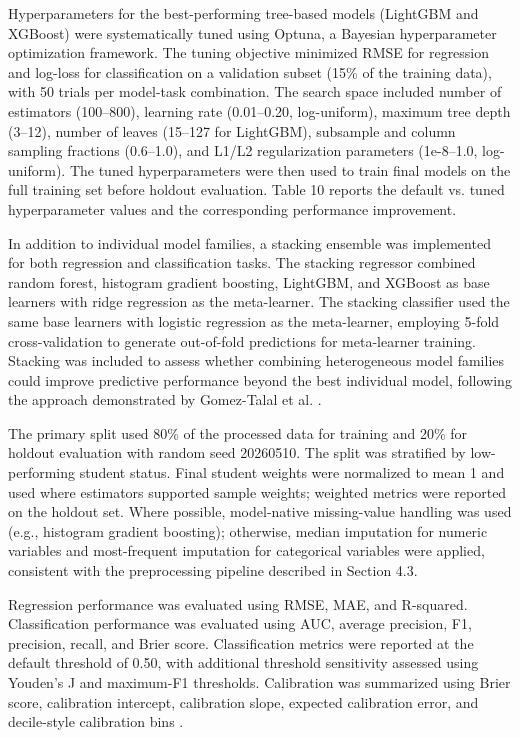 \documentclass[pdflatex,sn-mathphys-ay]{sn-jnl}
\begin{document}
Hyperparameters for the best-performing tree-based models (LightGBM and XGBoost) were systematically tuned using Optuna, a Bayesian hyperparameter optimization framework. The tuning objective minimized RMSE for regression and log-loss for classification on a validation subset (15\% of the training data), with 50 trials per model-task combination. The search space included number of estimators (100–800), learning rate (0.01–0.20, log-uniform), maximum tree depth (3–12), number of leaves (15–127 for LightGBM), subsample and column sampling fractions (0.6–1.0), and L1/L2 regularization parameters (1e-8–1.0, log-uniform). The tuned hyperparameters were then used to train final models on the full training set before holdout evaluation. Table 10 reports the default vs. tuned hyperparameter values and the corresponding performance improvement.

In addition to individual model families, a stacking ensemble was implemented for both regression and classification tasks. The stacking regressor combined random forest, histogram gradient boosting, LightGBM, and XGBoost as base learners with ridge regression as the meta-learner. The stacking classifier used the same base learners with logistic regression as the meta-learner, employing 5-fold cross-validation to generate out-of-fold predictions for meta-learner training. Stacking was included to assess whether combining heterogeneous model families could improve predictive performance beyond the best individual model, following the approach demonstrated by Gomez-Talal et al. \citep{Gomez_Talal_2025}.

The primary split used 80\% of the processed data for training and 20\% for holdout evaluation with random seed 20260510. The split was stratified by low-performing student status. Final student weights were normalized to mean 1 and used where estimators supported sample weights; weighted metrics were reported on the holdout set. Where possible, model-native missing-value handling was used (e.g., histogram gradient boosting); otherwise, median imputation for numeric variables and most-frequent imputation for categorical variables were applied, consistent with the preprocessing pipeline described in Section 4.3.

Regression performance was evaluated using RMSE, MAE, and R-squared. Classification performance was evaluated using AUC, average precision, F1, precision, recall, and Brier score. Classification metrics were reported at the default threshold of 0.50, with additional threshold sensitivity assessed using Youden's J and maximum-F1 thresholds. Calibration was summarized using Brier score, calibration intercept, calibration slope, expected calibration error, and decile-style calibration bins \citep{Steyerberg_2010}.
\end{document}
